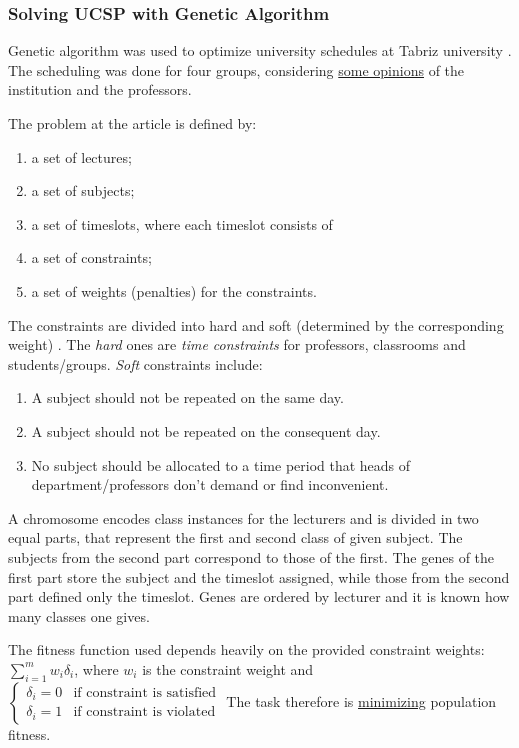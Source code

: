 \documentclass[../header]{subfiles}
\begin{document}
\providecommand{\rootdir}{..}



\subsubsection{Solving UCSP with Genetic Algorithm}
\label{sec:GA-UCSP}
Genetic algorithm was used to optimize university schedules at Tabriz university
\cite{UCSP-GA}. The scheduling was done for four groups, considering
\underline{some opinions} of the institution and the professors.

The problem at the article is defined by:
\begin{enumerate}
  \item a set of lectures;
  \item a set of subjects;
  \item a set of timeslots, where each timeslot consists of
  \item a set of constraints;
  \item a set of weights (penalties) for the constraints.
\end{enumerate}

The constraints are divided into hard and soft (determined by the corresponding
weight) \cite{UCSP-GA}.
The \emph{hard} ones are \emph{time constraints} for professors, classrooms and
students/groups.
\emph{Soft} constraints include:
\begin{enumerate}
  \item A subject should not be repeated on the same day.
  \item A subject should not be repeated on the consequent day.
  \item No subject should be allocated to a time period that
        heads of department/professors don't demand or find inconvenient.
\end{enumerate}



\bigskip\noindent
A chromosome encodes class instances for the lecturers and is divided in two equal
parts, that represent the first and second class of given subject.
The subjects from the second part correspond to those of the first.
The genes of the first part store the subject and the timeslot assigned, while
those from the second part defined only the timeslot. Genes are ordered by
lecturer and it is known how many classes one gives.

The fitness function used depends heavily on the provided constraint weights:
$\sum\limits_{i=1}^m w_i \delta_i$, where $w_i$ is the constraint weight and
$\begin{cases}
  \delta_i = 0 & \text{if constraint is satisfied}\\
  \delta_i = 1 & \text{if constraint is violated}
\end{cases}$
The task therefore is \underline{minimizing} population fitness.
\end{document}
